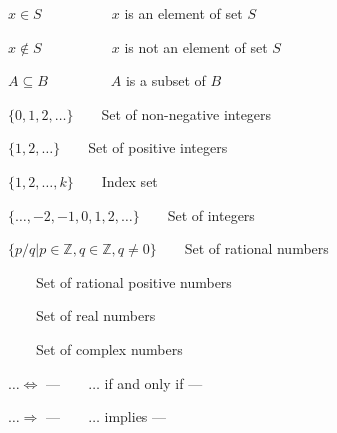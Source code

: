 %
%




\begin{description}[CABR]
\item[$\in$]{$x\in S$}~~~~~~~~~~\hfill{$x$ is an element of set $S$}
\item[$\notin$]{$x\notin{S}$}~~~~~~~~~~\hfill{$x$ is not an element of set $S$}
\item[$\subseteq$]{$A\subseteq{B}$}~~~~~~~~~\hfill{$A$ is a subset of $B$}
\item[$\mathbb{N}$]{$\{0,1,2,\ldots\}$}~~~~\hfill{Set of non-negative integers}
\item[$\mathbb{N}^+$]{$\{1,2,\ldots\}$}~~~~\hfill{Set of positive integers}
\item[$\mathbb{N}_k$]{$\{1,2,\ldots, k\}$}~~~~\hfill{Index set}
\item[$\mathbb{Z}$]{$\{\ldots, -2, -1, 0, 1,2,\ldots\}$}~~~~\hfill{Set of integers}
\item[$\mathbb{Q}$]{$\{p/q|p\in\mathbb{Z}, q\in\mathbb{Z},q\neq0\}$}~~~~\hfill{Set of rational numbers}
\item[$\mathbb{Q}^+$]~~~~\hfill{Set of rational positive numbers}
\item[$\mathbb{R}$]~~~~\hfill{Set of real numbers}
\item[$\mathbb{C}$]~~~~\hfill{Set of complex numbers}
\item[$\Leftrightarrow$]{$\ldots\Leftrightarrow$ ---}~~~~\hfill{$\ldots$ if and only if ---}
\item[$\Rightarrow$]{$\ldots\Rightarrow$ ---}~~~~\hfill{$\ldots$ implies ---}
\end{description}


